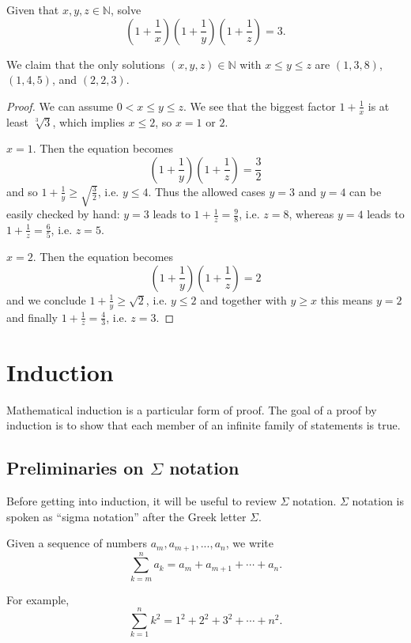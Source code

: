 \documentclass[11pt,dvipsnames]{book}
\numberwithin{figure}{section} %
\numberwithin{table}{section} %
\begin{document}
\begin{exercise} Given that $x,y,z\in\mathbb{N}$, solve
\[
\left(1+\frac{1}{x}\right)\left(1+\frac{1}{y}\right)\left(1+\frac{1}{z}\right)=3.
\]
\begin{solution}
We claim that the only solutions $(x,y,z)\in \mathbb N$ with $x\le y\le z$ are $(1,3,8)$, $(1,4,5)$, and $(2,2,3)$.

\begin{proof}
We can assume $0< x\leq y\leq z$. We see that the biggest factor $1+\frac1x$ is at least $\sqrt[3]3$, which implies $x\leq 2$, so $x=1$ or $2$.

 $x=1$. Then the equation becomes
$$\left(1+\frac1y\right)\left(1+\frac1z\right)=\frac32$$
and so $1+\frac1y\geq\sqrt{\frac32}$, i.e. $y\leq 4$.
Thus the allowed cases $y=3$ and $y=4$ can be easily checked by hand: $y=3$ leads to $1+\frac1z = \frac98$, i.e. $z=8$, whereas $y=4$ leads to $1+\frac1z = \frac{6}{5}$, i.e. $z=5$.

 $x=2$. Then the equation becomes
$$\left(1+\frac1y\right)\left(1+\frac1z\right)=2$$ and we conclude $1+\frac1y\ge\sqrt{2}$, i.e. $y\leq 2$ and together with $y\geq x$ this means $y=2$ and finally $1+\frac1z=\frac43$, i.e. $z=3$.
\end{proof}
\end{solution}
\end{exercise}


\chapter{Induction}

Mathematical induction is a particular form of proof.
The goal of a proof by induction is to show that each member of an infinite family of statements is true.

\section{Preliminaries on $\Sigma$ notation}

Before getting into induction, it will be useful to review $\Sigma$ notation.
$\Sigma$ notation is spoken as ``sigma notation'' after the Greek letter $\Sigma$.
\begin{definition}
Given a sequence of numbers $a_{m},a_{m+1},...,a_{n}$, we write
\[
\sum_{k=m}^{n} a_{k} = a_{m}+a_{m+1}+\cdots +a_{n}.
\]
\end{definition}
For example,
\[
\sum_{k=1}^{n} k^2 = 1^2+2^2+3^2+\cdots + n^2.
\]
\end{document}
